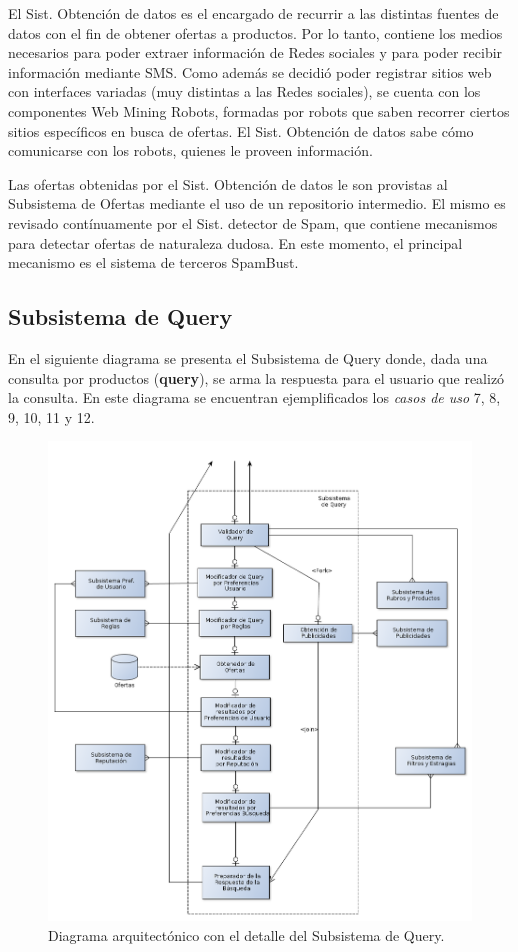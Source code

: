 El \textsf{Sist. Obtención de datos} es el encargado de recurrir a las distintas fuentes de datos con el fin de obtener ofertas a productos. Por lo tanto, contiene los medios necesarios para poder extraer información de \textsf{Redes sociales} y para poder recibir información mediante \textsf{SMS}. Como además se decidió poder registrar sitios web con interfaces variadas (muy distintas a las \textsf{Redes sociales}), se cuenta con los componentes \textsf{Web Mining Robots}, formadas por robots que saben recorrer ciertos sitios específicos en busca de ofertas. El \textsf{Sist. Obtención de datos} sabe cómo comunicarse con los robots, quienes le proveen información. 

Las ofertas obtenidas por el \textsf{Sist. Obtención de datos} le son provistas al \textsf{Subsistema de Ofertas} mediante el uso de un repositorio intermedio.
El mismo es revisado contínuamente por el \textsf{Sist. detector de Spam}, que contiene mecanismos para detectar ofertas de naturaleza dudosa. En este momento, el principal mecanismo es el sistema de terceros \textsf{SpamBust}.

\subsection{Subsistema de Query}

En el siguiente diagrama se presenta el \textsf{Subsistema de Query} donde, dada una consulta por productos (\textbf{query}), se arma la respuesta para el usuario que realizó la consulta. En este diagrama se encuentran ejemplificados los \emph{casos de uso} 7, 8, 9, 10, 11 y 12.

\begin{figure}[H]
	\centering
	\includegraphics[width=\textwidth]{graficos/arch/subsistema_query.png}
	\caption{Diagrama arquitectónico con el detalle del \textsf{Subsistema de Query}.}
\end{figure}

